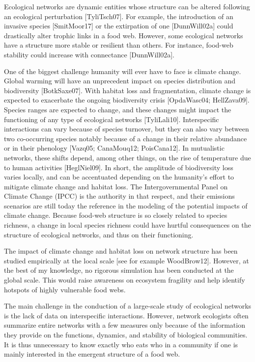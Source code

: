 Ecological networks are dynamic entities whose
structure can be altered following an ecological perturbation [TyliTsch07]. For
example, the introduction of an invasive species [SmitMoor17] or the
extirpation of one [DunnWill02a] could drastically alter trophic links in a
food web. However, some ecological networks have a structure more stable or
resilient than others. For instance, food-web stability could increase with
connectance [DunnWill02a].

One of the biggest challenge humanity will ever have to face is climate change.
Global warming will have an unprecedent impact on species distribution and
biodiversity [BotkSaxe07]. With habitat loss and fragmentation, climate change
is expected to exacerbate the ongoing biodiversity crisis [OpdaWasc04;
HellZava09]. Species ranges are expected to change, and these changes might
impact the functioning of any type of ecological networks [TyliLali10].
Interspecific interactions can vary because of species turnover, but they can
also vary between two co-occurring species notably because of a change in their
relative abundance or in their phenology [Vazq05; CanaMouq12; PoisCana12]. In
mutualistic networks, these shifts depend, among other things, on the rise of
temperature due to human activities [HeglNiel09]. In short, the amplitude of
biodiversity loss varies locally, and can be accentuated depending on the
humanity's effort to mitigate climate change and habitat loss. The
Intergovernmental Panel on Climate Change (IPCC) is the authority in that
respect, and their emissions scenarios are still today the reference in the
modeling of the potential impacts of climate change. Because food-web structure
is so closely related to species richness, a change in local species richness
could have hurtful consequences on the structure of ecological networks, and
thus on their functioning.

The impact of climate change and habitat loss on network structure has been
studied empirically at the local scale [see for example WoodBrow12]. However,
at the best of my knowledge, no rigorous simulation has been conducted at the
global scale. This would raise awareness on ecosystem fragility and help
identify hotspots of highly vulnerable food webs.

The main challenge in the conduction of a large-scale study of ecological
networks is the lack of data on interspecific interactions. However, network
ecologists often summarize entire networks with a few measures only because of
the information they provide on the functions, dynamics, and stability of
biological communities. It is thus unnecessary to know exactly who eats who in a
community if one is mainly interested in the emergent structure of a food web.


